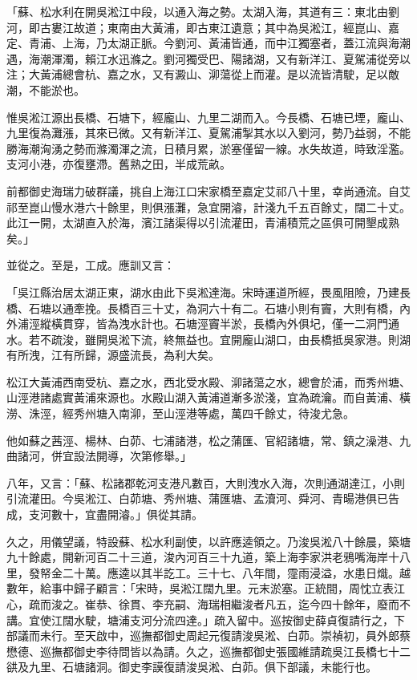 「蘇、松水利在開吳淞江中段，以通入海之勢。太湖入海，其道有三：東北由劉河，即古婁江故道；東南由大黃浦，即古東江遺意；其中為吳淞江，經崑山、嘉定、青浦、上海，乃太湖正脈。今劉河、黃浦皆通，而中江獨塞者，蓋江流與海潮遇，海潮渾濁，賴江水迅滌之。劉河獨受巴、陽諸湖，又有新洋江、夏駕浦從旁以注；大黃浦總會杭、嘉之水，又有澱山、泖蕩從上而灌。是以流皆清駛，足以敵潮，不能淤也。

惟吳淞江源出長橋、石塘下，經龐山、九里二湖而入。今長橋、石塘已堙，龐山、九里復為灘漲，其來已微。又有新洋江、夏駕浦掣其水以入劉河，勢乃益弱，不能勝海潮洶湧之勢而滌濁渾之流，日積月累，淤塞僅留一線。水失故道，時致淫濫。支河小港，亦復壅滯。舊熟之田，半成荒畝。

前都御史海瑞力破群議，挑自上海江口宋家橋至嘉定艾祁八十里，幸尚通流。自艾祁至崑山慢水港六十餘里，則俱漲灘，急宜開濬，計淺九千五百餘丈，闊二十丈。此江一開，太湖直入於海，濱江諸渠得以引流灌田，青浦積荒之區俱可開墾成熟矣。」

並從之。至是，工成。應訓又言：

「吳江縣治居太湖正東，湖水由此下吳淞達海。宋時運道所經，畏風阻險，乃建長橋、石塘以通牽挽。長橋百三十丈，為洞六十有二。石塘小則有竇，大則有橋，內外浦涇縱橫貫穿，皆為洩水計也。石塘涇竇半淤，長橋內外俱圮，僅一二洞門通水。若不疏浚，雖開吳淞下流，終無益也。宜開龐山湖口，由長橋抵吳家港。則湖有所洩，江有所歸，源盛流長，為利大矣。

松江大黃浦西南受杭、嘉之水，西北受水殿、泖諸蕩之水，總會於浦，而秀州塘、山涇港諸處實黃浦來源也。水殿山湖入黃浦道漸多淤淺，宜為疏瀹。而自黃浦、橫澇、洙涇，經秀州塘入南泖，至山涇港等處，萬四千餘丈，待浚尤急。

他如蘇之茜涇、楊林、白茆、七浦諸港，松之蒲匯、官紹諸塘，常、鎮之澡港、九曲諸河，併宜設法開導，次第修舉。」

八年，又言：「蘇、松諸郡乾河支港凡數百，大則洩水入海，次則通湖達江，小則引流灌田。今吳淞江、白茆塘、秀州塘、蒲匯塘、孟瀆河、舜河、青暘港俱已告成，支河數十，宜盡開濬。」俱從其請。

久之，用儀望議，特設蘇、松水利副使，以許應逵領之。乃浚吳淞八十餘晨，築塘九十餘處，開新河百二十三道，浚內河百三十九道，築上海李家洪老鴉嘴海岸十八里，發帑金二十萬。應逵以其半訖工。三十七、八年間，霪雨浸溢，水患日熾。越數年，給事中歸子顧言：「宋時，吳淞江闊九里。元末淤塞。正統間，周忱立表江心，疏而浚之。崔恭、徐貫、李充嗣、海瑞相繼浚者凡五，迄今四十餘年，廢而不講。宜使江闊水駛，塘浦支河分流四達。」疏入留中。巡按御史薛貞復請行之，下部議而未行。至天啟中，巡撫都御史周起元復請浚吳淞、白茆。崇禎初，員外郎蔡懋德、巡撫都御史李待問皆以為請。久之，巡撫都御史張國維請疏吳江長橋七十二谼及九里、石塘諸洞。御史李謨復請浚吳淞、白茆。俱下部議，未能行也。

